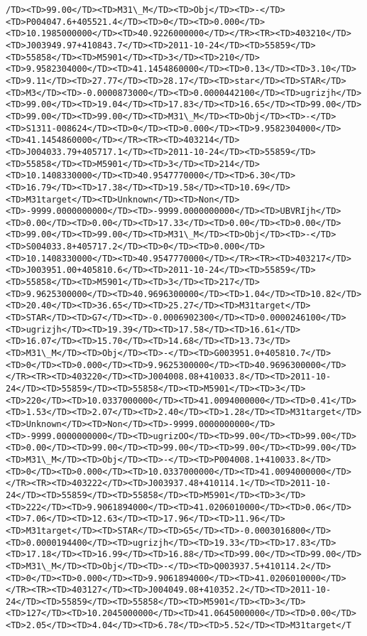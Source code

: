 \documentclass[11pt]{article}
\begin{document}
\begin{Verbatim}[commandchars=\\\{\}]
/TD><TD>99.00</TD><TD>M31\_M</TD><TD>Obj</TD><TD>-</TD><TD>P004047.6+405521.4</TD><TD>0</TD><TD>0.000</TD><TD>10.1985000000</TD><TD>40.9226000000</TD></TR><TR><TD>403210</TD><TD>J003949.97+410843.7</TD><TD>2011-10-24</TD><TD>55859</TD><TD>55858</TD><TD>M5901</TD><TD>3</TD><TD>210</TD><TD>9.9582304000</TD><TD>41.1454860000</TD><TD>0.13</TD><TD>3.10</TD><TD>9.11</TD><TD>27.77</TD><TD>28.17</TD><TD>star</TD><TD>STAR</TD><TD>M3</TD><TD>-0.0000873000</TD><TD>0.0000442100</TD><TD>ugrizjh</TD><TD>99.00</TD><TD>19.04</TD><TD>17.83</TD><TD>16.65</TD><TD>99.00</TD><TD>99.00</TD><TD>99.00</TD><TD>M31\_M</TD><TD>Obj</TD><TD>-</TD><TD>S1311-008624</TD><TD>0</TD><TD>0.000</TD><TD>9.9582304000</TD><TD>41.1454860000</TD></TR><TR><TD>403214</TD><TD>J004033.79+405717.1</TD><TD>2011-10-24</TD><TD>55859</TD><TD>55858</TD><TD>M5901</TD><TD>3</TD><TD>214</TD><TD>10.1408330000</TD><TD>40.9547770000</TD><TD>6.30</TD><TD>16.79</TD><TD>17.38</TD><TD>19.58</TD><TD>10.69</TD><TD>M31target</TD><TD>Unknown</TD><TD>Non</TD><TD>-9999.0000000000</TD><TD>-9999.0000000000</TD><TD>UBVRIjh</TD><TD>0.00</TD><TD>0.00</TD><TD>17.33</TD><TD>0.00</TD><TD>0.00</TD><TD>99.00</TD><TD>99.00</TD><TD>M31\_M</TD><TD>Obj</TD><TD>-</TD><TD>S004033.8+405717.2</TD><TD>0</TD><TD>0.000</TD><TD>10.1408330000</TD><TD>40.9547770000</TD></TR><TR><TD>403217</TD><TD>J003951.00+405810.6</TD><TD>2011-10-24</TD><TD>55859</TD><TD>55858</TD><TD>M5901</TD><TD>3</TD><TD>217</TD><TD>9.9625300000</TD><TD>40.9696300000</TD><TD>1.04</TD><TD>10.82</TD><TD>20.40</TD><TD>36.65</TD><TD>25.27</TD><TD>M31target</TD><TD>STAR</TD><TD>G7</TD><TD>-0.0006902300</TD><TD>0.0000246100</TD><TD>ugrizjh</TD><TD>19.39</TD><TD>17.58</TD><TD>16.61</TD><TD>16.07</TD><TD>15.70</TD><TD>14.68</TD><TD>13.73</TD><TD>M31\_M</TD><TD>Obj</TD><TD>-</TD><TD>G003951.0+405810.7</TD><TD>0</TD><TD>0.000</TD><TD>9.9625300000</TD><TD>40.9696300000</TD></TR><TR><TD>403220</TD><TD>J004008.08+410033.8</TD><TD>2011-10-24</TD><TD>55859</TD><TD>55858</TD><TD>M5901</TD><TD>3</TD><TD>220</TD><TD>10.0337000000</TD><TD>41.0094000000</TD><TD>0.41</TD><TD>1.53</TD><TD>2.07</TD><TD>2.40</TD><TD>1.28</TD><TD>M31target</TD><TD>Unknown</TD><TD>Non</TD><TD>-9999.0000000000</TD><TD>-9999.0000000000</TD><TD>ugrizOO</TD><TD>99.00</TD><TD>99.00</TD><TD>0.00</TD><TD>99.00</TD><TD>99.00</TD><TD>99.00</TD><TD>99.00</TD><TD>M31\_M</TD><TD>Obj</TD><TD>-</TD><TD>P004008.1+410033.8</TD><TD>0</TD><TD>0.000</TD><TD>10.0337000000</TD><TD>41.0094000000</TD></TR><TR><TD>403222</TD><TD>J003937.48+410114.1</TD><TD>2011-10-24</TD><TD>55859</TD><TD>55858</TD><TD>M5901</TD><TD>3</TD><TD>222</TD><TD>9.9061894000</TD><TD>41.0206010000</TD><TD>0.06</TD><TD>7.06</TD><TD>12.63</TD><TD>17.96</TD><TD>11.96</TD><TD>M31target</TD><TD>STAR</TD><TD>G5</TD><TD>-0.0003016800</TD><TD>0.0000194400</TD><TD>ugrizjh</TD><TD>19.33</TD><TD>17.83</TD><TD>17.18</TD><TD>16.99</TD><TD>16.88</TD><TD>99.00</TD><TD>99.00</TD><TD>M31\_M</TD><TD>Obj</TD><TD>-</TD><TD>Q003937.5+410114.2</TD><TD>0</TD><TD>0.000</TD><TD>9.9061894000</TD><TD>41.0206010000</TD></TR><TR><TD>403127</TD><TD>J004049.08+410352.2</TD><TD>2011-10-24</TD><TD>55859</TD><TD>55858</TD><TD>M5901</TD><TD>3</TD><TD>127</TD><TD>10.2045000000</TD><TD>41.0645000000</TD><TD>0.00</TD><TD>2.05</TD><TD>4.04</TD><TD>6.78</TD><TD>5.52</TD><TD>M31target</T
\end{Verbatim}
\end{document}
